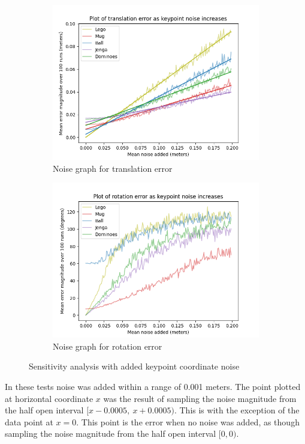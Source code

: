 \begin{figure}[h]
    \centering
    \begin{subfigure}[t]{0.49\textwidth}
        \includegraphics[width=\textwidth]{figures/fig_coordinate_noise-translation.png}
        \caption{Noise graph for translation error}
        \label{fig:noise-coord-translation}
    \end{subfigure}
    \hfill
    \begin{subfigure}[t]{0.49\textwidth}
        \includegraphics[width=\textwidth]{figures/fig_coordinate_noise-rotation.png}
        \caption{Noise graph for rotation error}
        \label{fig:noise-coord-rotation}
    \end{subfigure}
    \caption{Sensitivity analysis with added keypoint coordinate noise}
    \label{fig:noise-coord}
\end{figure}
In these tests noise was added within a range of 0.001 meters. The point plotted at horizontal coordinate $x$ was the result of sampling the noise magnitude from the half open interval $[x-0.0005,\: x+0.0005)$. This is with the exception of the data point at $x=0$. This point is the error when no noise was added, as though sampling the noise magnitude from the half open interval $[0,0).$

